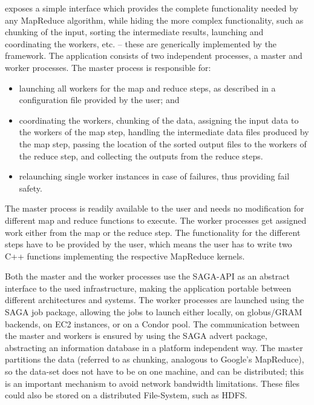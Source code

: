 \documentclass[3p,twocolumn]{elsarticle}
\begin{document}
\smr exposes a simple interface which provides the complete
functionality needed by any MapReduce algorithm, while hiding the more
complex functionality, such as chunking of the input, sorting the
intermediate results, launching and coordinating the workers, etc. --
these are generically implemented by the framework.  The application
consists of two independent processes, a master and worker processes.
The master process is responsible for:

\begin{itemize}
\item launching all workers for the map and reduce steps, as described
  in a configuration file provided by the user; and
\item coordinating the workers, chunking of the
  data, assigning the input data to the workers of the map step,
  handling the intermediate data files produced by the map step, 
  passing the location of the sorted output files to the workers of the
  reduce step, and collecting the outputs from the reduce
  steps.  
\item relaunching single worker instances in case of failures, thus
  providing fail safety.
\end{itemize}

The master process is readily available to the user and needs no
modification for different map and reduce functions to execute.  The
worker processes get assigned work either from the map or the reduce
step. The functionality for the different steps have to be provided by
the user, which means the user has to write two C++ functions
implementing the respective MapReduce kernels.

Both the master and the worker processes use the SAGA-API as an
abstract interface to the used infrastructure, making the application
portable between different architectures and systems.  The worker
processes are launched using the SAGA job package, allowing the jobs
to launch either locally, on globus/GRAM backends, on EC2 instances,
or on a Condor pool. The communication between the master and workers
is ensured by using the SAGA advert package, abstracting an
information database in a platform independent way.  The master
partitions the data (referred to as chunking, analogous to Google's
MapReduce), so the data-set does not have to be on one machine, and
can be distributed; this is an important mechanism to avoid network
bandwidth limitations.  These files could also be stored on a
distributed File-System, such as HDFS.
\end{document}

